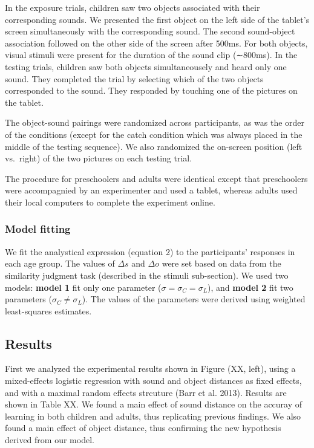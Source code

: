 \documentclass[10pt, letterpaper]{article}
\begin{document}
In the exposure trials, children saw two objects associated with their
corresponding sounds. We presented the first object on the left side of
the tablet's screen simultaneously with the corresponding sound. The
second sound-object association followed on the other side of the screen
after 500ms. For both objects, visual stimuli were present for the
duration of the sound clip (∼800ms). In the testing trials, children saw
both objects simultaneousely and heard only one sound. They completed
the trial by selecting which of the two objects corresponded to the
sound. They responded by touching one of the pictures on the tablet.

The object-sound pairings were randomized across participants, as was
the order of the conditions (except for the catch condition which was
always placed in the middle of the testing sequence). We also randomized
the on-screen position (left vs.~right) of the two pictures on each
testing trial.

The procedure for preschoolers and adults were identical except that
preschoolers were accompagnied by an experimenter and used a tablet,
whereas adults used their local computers to complete the experiment
online.

\subsubsection{Model fitting}\label{model-fitting}

We fit the analystical expression (equation 2) to the participants'
responses in each age group. The values of \(\Delta s\) and \(\Delta o\)
were set based on data from the similarity judgment task (described in
the stimuli sub-section). We used two models: \textbf{model 1} fit only
one parameter (\(\sigma = \sigma_C =\sigma_L\)), and \textbf{model 2}
fit two parameters (\(\sigma_C \neq \sigma_L\)). The values of the
parameters were derived using weighted least-squares estimates.

\subsection{Results}\label{results}

First we analyzed the experimental results shown in Figure (XX, left),
using a mixed-effects logistic regression with sound and object
distances as fixed effects, and with a maximal random effects strcuture
(Barr et al. 2013). Results are shown in Table XX. We found a main
effect of sound distance on the accuray of learning in both children and
adults, thus replicating previous findings. We also found a main effect
of object distance, thus confirming the new hypothesis derived from our
model.
\end{document}
